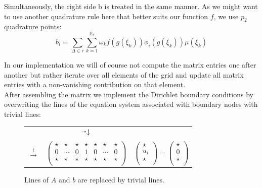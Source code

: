 \documentclass[11pt,a4paper,headinclude,footinclude,DIV16,normalheadings]{scrreprt}
\begin{document}
Simultaneously, the right side b is treated in the same manner. As we might want to use another quadrature rule here that better suits our function $f$, we use $p_2$ quadrature points:
\begin{equation}
\label{equ:computeb}
 b_i = \sum\limits_{\Delta\in\tau}\sum\limits_{k=1}^{p_2}\omega_k f(g(\xi_k ))\phi_i (g(\xi_k ))\mu(\xi_k )
\end{equation}

In our implementation we will of course not compute the matrix entries one after another but rather iterate over all elements of the grid and update all matrix entries with a non-vanishing contribution on that element. \\

After assembling the matrix we implement the Dirichlet boundary conditions by overwriting the lines of the equation system associated with boundary nodes with trivial lines:

\begin{figure}[h]
\def\rb#1{\rotatebox{90}{$\xleftarrow{#1}$}}
\begin{center}
\begin{tabular}{ccl}
& $\begin{array}{cccccccc}
& & &\rb{i}& & &\\
\end{array}$ & \\
$\xrightarrow{i}$ &
$\left(\begin{array}{ccccccc}
\star&\star&\star&\star&\star&\star&\star\\
0&\cdots&0&1&0&\cdots&0\\
\star&\star&\star&\star&\star&\star&\star\\
\end{array}\right)$ &
$\left(\begin{array}{c}
\star \\
u_i \\
\star \\
\end{array}\right)
=
\left(\begin{array}{c}
\star \\
0 \\
\star \\
\end{array}\right)$
\end{tabular}
\end{center}
\caption{Lines of $A$ and $b$ are replaced by trivial lines.}
\label{Fig:dirichlet}
\end{figure}
\end{document}
